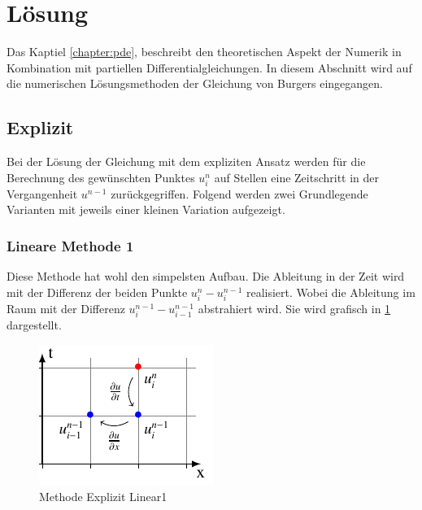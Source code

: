 %
%
\section{Lösung
\label{burgers:section:loesung}}

Das Kaptiel \ref{chapter:pde}, beschreibt den theoretischen Aspekt der Numerik in Kombination mit partiellen Differentialgleichungen.
In diesem Abschnitt wird auf die numerischen Lösungsmethoden der Gleichung von Burgers eingegangen.


\subsection{Explizit}

Bei der Lösung der Gleichung mit dem expliziten Ansatz werden für die Berechnung des gewünschten Punktes $u_i^n$ auf Stellen eine  Zeitschritt in der Vergangenheit $u^{n-1}$ zurückgegriffen.
Folgend werden zwei Grundlegende Varianten mit jeweils einer kleinen Variation aufgezeigt.
 
\subsubsection{Lineare Methode 1}
	
	Diese Methode hat wohl den simpelsten Aufbau.
	Die Ableitung in der Zeit wird mit der Differenz der beiden Punkte $u_{i}^{n}-u_{i}^{n-1}$ realisiert.
	Wobei die Ableitung im Raum mit der Differenz $u_{i}^{n-1}-u_{i-1}^{n-1}$ abstrahiert wird.
	Sie wird grafisch in \ref{burgers:fig:Linear1} dargestellt.

	
	     \begin{figure}
		\centering
		\includegraphics[height=.4\textwidth]{papers/burgers/BurgersEquation/tikz/Linear1/Linear1.pdf}
		\caption{Methode Explizit Linear1}
		\label{burgers:fig:Linear1}
		\end{figure}
	
